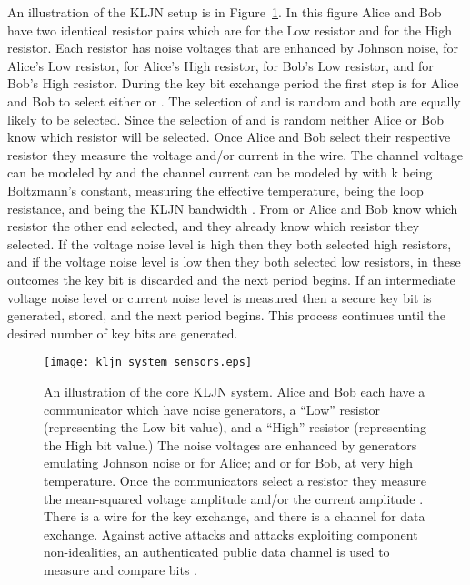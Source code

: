 \documentclass{ws-fnl2}
\begin{document}
An illustration of the KLJN setup is in Figure~\ref{figone}. In this figure Alice and Bob have two identical resistor pairs which are  for the Low resistor and  for the High resistor. Each resistor has noise voltages that are enhanced by Johnson noise,  for Alice's Low resistor,  for Alice's High resistor,  for Bob's Low resistor, and  for Bob's High resistor. During the key bit exchange period the first step is for Alice and Bob to select either  or . The selection of  and  is random and both are equally likely to be selected. Since the selection of  and  is random neither Alice or Bob know which resistor will be selected. Once Alice and Bob select their respective resistor they measure the voltage and/or current in the wire. The channel voltage can be modeled by  and the channel current can be modeled by  with k being Boltzmann's constant,  measuring the effective temperature,  being the loop resistance, and  being the KLJN bandwidth \cite{kljn1}. From  or  Alice and Bob know which resistor the other end selected, and they already know which resistor they selected. If the voltage noise level is high then they both selected high resistors, and if the voltage noise level is low then they both selected low resistors, in these outcomes the key bit is discarded and the next period begins. If an intermediate voltage noise level or current noise level is measured then a secure key bit is generated, stored, and the next period begins. This process continues until the desired number of key bits are generated.



\begin{figure}[ht]
    \label{figone}
  \centering
\texttt{[image: kljn\_system\_sensors.eps]}
    \vspace*{8pt}
    \caption{An illustration of the core KLJN system. Alice and Bob each have a communicator which have noise generators, a ``Low'' resistor  (representing the Low bit value), and a ``High'' resistor  (representing the High bit value.) The noise voltages are enhanced by generators emulating Johnson noise  or  for Alice; and  or  for Bob, at very high temperature. Once the communicators select a resistor they measure the mean-squared voltage amplitude  and/or the current amplitude . There is a wire for the key exchange, and there is a channel for data exchange. Against active attacks and attacks exploiting component non-idealities, an authenticated public data channel is used to measure and compare bits \cite{lk2, c111}.}
\end{figure}
\end{document}
